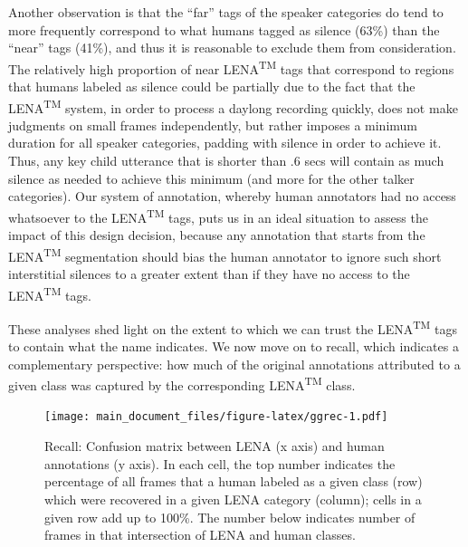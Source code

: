 \documentclass[english,table,man,floatsintext]{apa6}
\begin{document}
Another observation is that the \enquote{far} tags of the speaker categories do tend to more frequently correspond to what humans tagged as silence (63\%) than the \enquote{near} tags (41\%), and thus it is reasonable to exclude them from consideration. The relatively high proportion of near LENA\textsuperscript{TM} tags that correspond to regions that humans labeled as silence could be partially due to the fact that the LENA\textsuperscript{TM} system, in order to process a daylong recording quickly, does not make judgments on small frames independently, but rather imposes a minimum duration for all speaker categories, padding with silence in order to achieve it. Thus, any key child utterance that is shorter than .6 secs will contain as much silence as needed to achieve this minimum (and more for the other talker categories). Our system of annotation, whereby human annotators had no access whatsoever to the LENA\textsuperscript{TM} tags, puts us in an ideal situation to assess the impact of this design decision, because any annotation that starts from the LENA\textsuperscript{TM} segmentation should bias the human annotator to ignore such short interstitial silences to a greater extent than if they have no access to the LENA\textsuperscript{TM} tags.

These analyses shed light on the extent to which we can trust the LENA\textsuperscript{TM} tags to contain what the name indicates. We now move on to recall, which indicates a complementary perspective: how much of the original annotations attributed to a given class was captured by the corresponding LENA\textsuperscript{TM} class.

\begin{figure}
\centering
\texttt{[image: main\_document\_files/figure-latex/ggrec-1.pdf]}
\caption{\label{fig:ggrec}Recall: Confusion matrix between LENA (x axis) and human annotations (y axis). In each cell, the top number indicates the percentage of all frames that a human labeled as a given class (row) which were recovered in a given LENA category (column); cells in a given row add up to 100\%. The number below indicates number of frames in that intersection of LENA and human classes.}
\end{figure}
\end{document}
